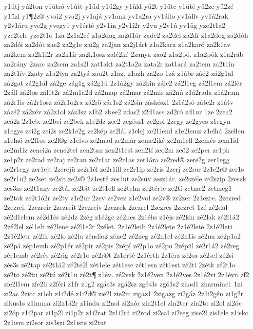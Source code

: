 {y1útj
yú2ton
y1útró
y1útt
y1üd
y1ü2gy
y1üld
yü2t
y1üte
y1üté
yü2ze
yü2zé
y1üzl
y1¶2z®
yvai2
yva2j
yv1ajá
yv1ank
yv1a2ra
yv1állo
yv1állv
yv1á2rak
y2v1áru
yve2g
yvegy1
yv1érté
y2v1in
y2v1í2r
y2vu
y2v1ú
yv1üg
yze2t1a2
yze2tele
yze2t1o
1za
2z1a2cé
z1a2dag
za2d1ár
zade2
za2del
za2dí
z1a2dog
za2dóh
za2dói
za2dót
zae2
za2g1e
zai2g
za2jan
za2j1árt
z1a2kara
z1a2karó
za2k1av
za2kem
za2k1i2r
za2k1ír
za2k1osz
zalé2ké
2zanya
zao2
z1a2pó.
z1a2pók
z1a2ráb
za2rány
2zarc
za2sem
za1s2l
zat1akt
za2t1a2n
zata2r
zat1ará
za2tem
za2t1in
za2t1ív
2zaty
z1a2tya
za2tyá
zau2t
z1az.
z1azh
za2zo
1zá
z1ábr
záé2
zá2g1al
zá2gat
zá2g1ál
zá2ge
zág1g
zá2g1ú
2z1á2gy
zá2kin
zále2
zá2l1eg
zá2l1em
zá2lér
2záll
zá2los
zál1t2r
zá2m1a2d
zá2map
zá2mar
zá2mis
zá2nú
z1á2rada
z1á2ram
zá2r1is
zá2r1osz
zá2r1ó2ra
zá2rö
zár1s2
zá2sin
záskész1
2z1á2só
záte2r
z1átv
zázé2
zá2zév
zá2z1ol
záz3sz
z1b2
zbee2
zdas2
z2d1ass
zd2ró
zd1ur
1ze
2zea2
zeá2z
2z1eb.
ze2bei
ze2bek
z1e2dz
zee2
zegész1
ze2gol
2zegy
ze2gyes
z1egyn
z1egys
zei2g
zei2s
ze2k1e2g
ze2kép
ze2lál
z1elej
ze2l1eml
z1e2lemz
z1elhá
2zellen
z1elnö
ze2l1os
ze2l®g
z1elvo
ze2mad
ze2már
zeme2iké
ze2m1ell
2zemés
zem1id
ze2m1iz
zenci2a
zene2tel
zen2tan
zen2t1est
zen2tí
zeo2m
zeö2
ze2per
ze1ph
ze1p2r
ze2rad
ze2raj
ze2ran
ze2r1ar
ze2r1as
zer1ára
ze2red®
zere2g
zer1egg
ze2r1egy
zer1ejt
2zerejü
ze2r1él
ze2r1ill
ze2r1ip
ze2ris
2zerj
ze2ror
2z1e2r®
zer1s
ze2r1u2
ze2set
ze2sit
ze2s®
2z1esté
zes1ut
ze2süv
zesz1ár.
ze2széle
ze2szip
2zeszk
zes3zs
ze2t1any
ze2tál
ze2tát
ze2t1ell
ze2telm
ze2térte
ze2tí
zetme2
zetmeg1
ze2tok
ze2t1ó2r
ze2ty
z1e2ur
2zev
ze2vez
z1e2vol
ze2v®
ze2zer
2z1ezre.
2zezred
2zezrei.
2zezreir
2zezreit
2zezreiv
2zezrek
2zezrel
2zezres
2zezret
1zé
zé2dal
zé2d1elem
zé2d1és
zé2dz
2zég
z1é2ge
zé2hes
2z1éhs
z1éjs
zé2kin
zé2lak
zé2l1á2
2zé2lel
zél1elt
zé2lene
zé2l1e2r
2zélet.
2z1é2letb
2z1é2lete
2z1é2leté
2z1é2leti
2z1é2letr
zé2lir
zé2lo
zé2lu
zéndio2
zéne2
zé2neg
zé2n1el
zé2n1is
zé2nu
zé2p1a2
zé2pá
zép1emb
zé2p1ér
zé2pir
zé2pis
2zépí
zé2p1o
zé2pu
2zépül
zé2r1á2
zé2reg
zér1emb
zé2rés
zé2rig
zé2r1o
zé2r®t
2z1érté
2z1érth
2z1érz
zé2sa
zé2sel
zé2sí
zés3s
zé2tap
zé2t1á2
zé2te2l
zét1ele
zét1ese
zét1esn
zét1est
zé2ti
2zétk
zé2t1o
zé2tö
zé2tu
zé2tú
zé2t1ü
zé2t¶
z1év.
zé2vek
2z1é2ven
2z1é2ves
2z1é2vi
2z1évn
zf2
zfe2l1em
zfe2li
z2féri
z1fr
z1g2
zgás3s
zgá2sz
zgés3s
zgó1s2
zhad1
zharminc1
1zi
zi2ac
2zicc
zi1ch
z1i2dé
z1i2d®
zie2l
zie2m
zigaz1
2zigazg
zi2gáz
2z1i2gén
zi1g2r
zikus1s
z1imma
zi2n1á2r
z1indu
zi2nol
zi2nór
zin2t1el
zin2ter
zin2to
zi2ol
zi2óc
zi2óp
z1i2par
zi1p2l
zi1p2r
z1i2rat
2z1i2rá
zi2rod
zi2sal
zi2seg
zise2l
zis1ele
z1isko
2z1ism
zi2sor
zis3szi
2z1iste
zi2tut
}

